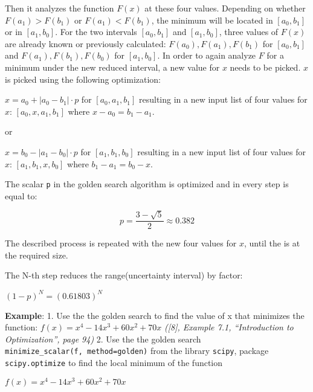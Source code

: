 \documentclass[11pt]{article}
\begin{document}
Then it analyzes the function \(F(x)\) at these four values. Depending
on whether \(F(a_1) > F(b_1)\) or \(F(a_1) < F(b_1)\), the minimum will
be located in \([a_0, b_1]\) or in \([a_1, b_0]\). For the two intervals
\([a_0, b_1]\) and \([a_1, b_0]\), three values of \(F(x)\) are already
known or previously calculated: \(F(a_0), F(a_1), F(b_1)\) for
\([a_0, b_1]\) and \(F(a_1), F(b_1), F(b_0)\) for \([a_1, b_0]\). In
order to again analyze \(F\) for a minimum under the new reduced
interval, a new value for \(x\) needs to be picked. \(x\) is picked
using the following optimization:

\(x = a_0 + |a_0 - b_1| \cdot p\) for \([a_0, a_1, b_1]\) resulting in a
new input list of four values for \(x\): \([a_0, x, a_1, b_1]\) where
\(x - a_0 = b_1 - a_1\).

or

\(x = b_0 - |a_1 - b_0| \cdot p\) for \([a_1, b_1, b_0]\) resulting in a
new input list of four values for \(x\): \([a_1, b_1, x, b_0]\) where
\(b_1 - a_1 = b_0 - x\).

The scalar \texttt{p} in the golden search algorithm is optimized and in
every step is equal to:

\[p = \frac{3 - \sqrt{5}}{2} \approx 0.382 \]

The described process is repeated with the new four values for \(x\),
until the is at the required size.

The N-th step reduces the range(uncertainty interval) by factor:

\((1 - p)^N = (0.61803)^N\)

\textbf{Example}: 1. Use the the golden search to find the value of x
that minimizes the function: \(f(x) = x^4 - 14x^3 + 60x^2 + 70x\)
\emph{({[}8{]}, Example 7.1, ``Introduction to Optimization'', page 94)}
2. Use the the golden search
\texttt{minimize\_scalar(f,\ method=\textquotesingle{}golden\textquotesingle{})}
from the library \texttt{scipy}, package \texttt{scipy.optimize} to find
the local minimum of the function

\(f(x) = x^4 - 14x^3 + 60x^2 + 70x\)
\end{document}
